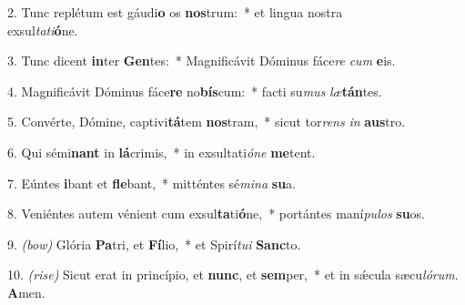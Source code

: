 2. Tunc replétum est gáudi\textbf{o} os \textbf{nos}trum:~* et lingua nostra\\ exsul\textit{ta}\textit{ti}\textbf{ó}ne.

3. Tunc dicent \textbf{in}ter \textbf{Gen}tes:~* Magnificávit Dóminus fáce\textit{re} \textit{cum} \textbf{e}is.

4. Magnificávit Dóminus fáce\textbf{re} no\textbf{bís}cum:~* facti su\textit{mus} \textit{læ}\textbf{tán}tes.

5. Convérte, Dómine, captivi\textbf{tá}tem \textbf{nos}tram,~* sicut tor\textit{rens} \textit{in} \textbf{aus}tro.

6. Qui sémi\textbf{nant} in \textbf{lá}crimis,~* in exsultati\textit{ó}\textit{ne} \textbf{me}tent.

7. Eúntes \textbf{i}bant et \textbf{fle}bant,~* mitténtes sé\textit{mi}\textit{na} \textbf{su}a.

8. Veniéntes autem vénient cum exsul\textbf{ta}ti\textbf{ó}ne,~* portántes maní\textit{pu}\textit{los} \textbf{su}os.

9. {\color{red}\textit{(bow)}} Glória \textbf{Pa}tri, et \textbf{Fí}lio,~* et Spirí\textit{tu}\textit{i} \textbf{Sanc}to.

10. {\color{red}\textit{(rise)}} Sicut erat in princípio, et \textbf{nunc}, et \textbf{sem}per,~* et in sǽcula sæcu\textit{ló}\textit{rum}. \textbf{A}men.